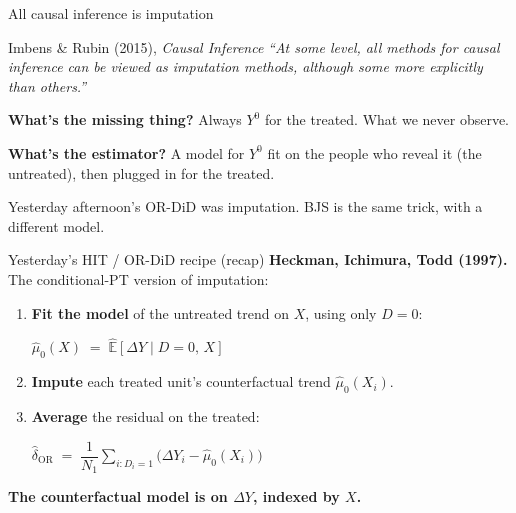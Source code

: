 \documentclass[aspectratio=169,11pt]{beamer}
\begin{document}

\begin{frame}{All causal inference is imputation}
\vspace{0.6em}
\begin{block}{Imbens \& Rubin (2015), \textit{Causal Inference}}
\centering
\itshape
``At some level, all methods for causal inference can be viewed as imputation methods, although some more explicitly than others.''
\end{block}

\vspace{0.7em}
\textbf{What's the missing thing?} \;Always $Y^0$ for the treated. \;What we never observe.

\vspace{0.4em}
\textbf{What's the estimator?} \;A model for $Y^0$ fit on the people who reveal it (the untreated), then plugged in for the treated.

\vspace{0.5em}
 \;Yesterday afternoon's OR-DiD was imputation. \;BJS is the same trick, with a different model.
\end{frame}

\begin{frame}{Yesterday's HIT / OR-DiD recipe (recap)}
\vspace{0.5em}
\textbf{Heckman, Ichimura, Todd (1997).} \;The conditional-PT version of imputation:
\vspace{0.5em}
\begin{enumerate}\small
  \item \textbf{Fit the model} of the untreated trend on $X$, using only $D=0$:
  \begin{center}\small
  $\widehat{\mu}_0(X) \;=\; \widehat{\mathbb{E}}[\Delta Y \mid D{=}0,\, X]$
  \end{center}
  \item \textbf{Impute} each treated unit's counterfactual trend $\widehat{\mu}_0(X_i)$.
  \item \textbf{Average} the residual on the treated:
  \begin{center}\small
  $\widehat{\delta}_{\text{OR}} \;=\; \dfrac{1}{N_1}\displaystyle\sum_{i:D_i=1}\big(\Delta Y_i - \widehat{\mu}_0(X_i)\big)$
  \end{center}
\end{enumerate}
\vspace{0.5em}
\textbf{The counterfactual model is on \boldmath$\Delta Y$, indexed by \boldmath$X$.}
\end{frame}
\end{document}
